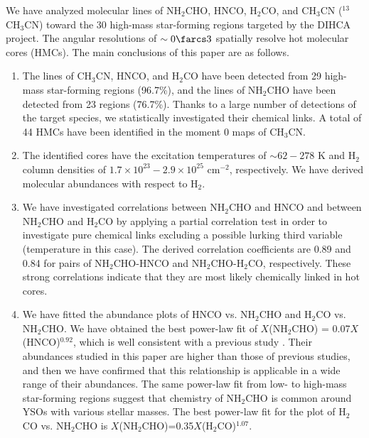 \documentclass[twocolumn, twocolappendix]{aastex631}
\begin{document}
We have analyzed molecular lines of NH$_{2}$CHO, HNCO, H$_{2}$CO, and CH$_{3}$CN ($^{13}$CH$_{3}$CN) toward the 30 high-mass star-forming regions targeted by the DIHCA project.
The angular resolutions of $\sim0\farcs3$ spatially resolve hot molecular cores (HMCs).
The main conclusions of this paper are as follows.

\begin{enumerate}
\item The lines of CH$_{3}$CN, HNCO, and H$_{2}$CO have been detected from 29 high-mass star-forming regions (96.7\%), and the lines of NH$_{2}$CHO have been detected from 23 regions (76.7\%).
Thanks to a large number of detections of the target species, we statistically investigated their chemical links.
A total of 44 HMCs have been identified in the moment 0 maps of CH$_{3}$CN.

\item The identified cores have the excitation temperatures of $\sim62-278$ K and H$_{2}$ column densities of $1.7\times10^{23}-2.9\times10^{25}$ cm$^{-2}$, respectively. We have derived molecular abundances with respect to H$_{2}$.

\item We have investigated correlations between NH$_{2}$CHO and HNCO and  between NH$_{2}$CHO and H$_{2}$CO by applying a partial correlation test in order to investigate pure chemical links excluding a possible lurking third variable (temperature in this case).
The derived correlation coefficients are 0.89 and 0.84 for pairs of NH$_{2}$CHO-HNCO and NH$_{2}$CHO-H$_{2}$CO, respectively.
These strong correlations indicate that they are most likely chemically linked in hot cores.

\item We have fitted the abundance plots of HNCO vs. NH$_{2}$CHO and H$_{2}$CO vs. NH$_{2}$CHO.
We have obtained the best power-law fit of $X$(NH$_{2}$CHO) = 0.07$X$(HNCO)$^{0.92}$, which is well consistent with a previous study \citep[$X$(NH$_{2}$CHO) = 0.04$X$(HNCO)$^{0.93}$;][]{2015MNRAS.449.2438L}.
Their abundances studied in this paper are higher than those of previous studies, and then we have confirmed that this relationship is applicable in a wide range of their abundances.
The same power-law fit from low- to high-mass star-forming regions suggest that chemistry of NH$_{2}$CHO is common around YSOs with various stellar masses.
The best power-law fit for the plot of H$_{2}$CO vs. NH$_{2}$CHO is $X$(NH$_{2}$CHO)=0.35$X$(H$_{2}$CO)$^{1.07}$.


\end{enumerate}
\end{document}
